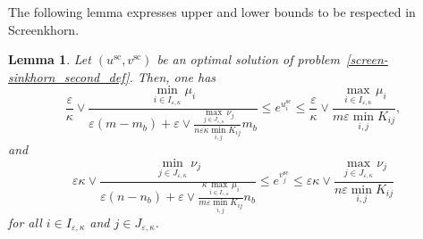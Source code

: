 \documentclass{article}
\newtheorem{lemma}{Lemma}
\begin{document}
The following lemma expresses upper and lower bounds to be respected in Screenkhorn.
\begin{lemma}
\label{lemma_bounds_of_usc_and_vsc}
Let $(u^{\text{sc}}, v^{\text{sc}})$ be an optimal solution of problem~\eqref{screen-sinkhorn_second_def}. Then,
one has
\begin{equation}
\label{bound_on_u}
\frac \varepsilon\kappa \vee \frac{\min_{i \in I_{\varepsilon,\kappa}}\mu_i}{\varepsilon (m- m_b) + \varepsilon \vee \frac{\max_{j\in J_{\varepsilon,\kappa}} \nu_j}{n\varepsilon\kappa\min_{i,j}K_{ij}} m_b} \leq e^{u^{\text{sc}}_i} \leq \frac \varepsilon\kappa\vee \frac{\max_{i \in I_{\varepsilon,\kappa}} \mu_i}{m\varepsilon\min_{i,j}K_{ij}},
\end{equation}
and
\begin{equation}
\label{bound_on_v}
\varepsilon\kappa \vee \frac{\min_{j \in J_{\varepsilon,\kappa}}\nu_j}{\varepsilon(n- n_b) + \varepsilon \vee \frac{\kappa\max_{i\in I_{\varepsilon,\kappa}} \mu_i}{m\varepsilon\min_{i,j}K_{ij}} n_b} \leq e^{v^{\text{sc}}_j} \leq \varepsilon\kappa \vee \frac{\max_{j \in J_{\varepsilon,\kappa}} \nu_j}{n\varepsilon\min_{i,j}K_{ij}}
\end{equation}
for all $i\in I_{\varepsilon,\kappa}$ and $j\in J_{\varepsilon,\kappa}$.
\end{lemma}
\end{document}
